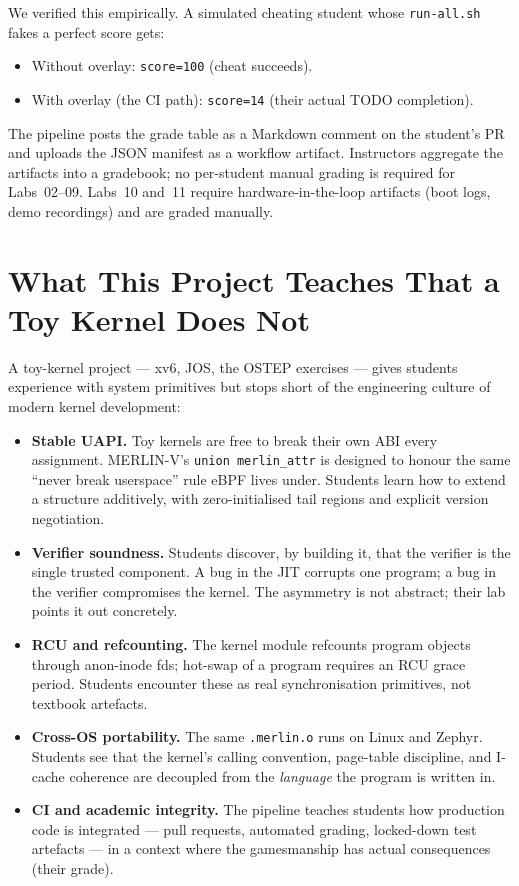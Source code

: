 \documentclass[11pt,a4paper]{article}
\begin{document}
We verified this empirically.  A simulated cheating student
whose \texttt{run-all.sh} fakes a perfect score gets:
\begin{itemize}[leftmargin=*]
  \item Without overlay: \texttt{score=100} (cheat succeeds).
  \item With overlay (the CI path):  \texttt{score=14}
    (their actual TODO completion).
\end{itemize}

The pipeline posts the grade table as a Markdown comment on the
student's PR and uploads the JSON manifest as a workflow
artifact.  Instructors aggregate the artifacts into a
gradebook; no per-student manual grading is required for
Labs~02--09.  Labs~10 and~11 require hardware-in-the-loop
artifacts (boot logs, demo recordings) and are graded
manually.

\section{What This Project Teaches That a Toy Kernel Does Not}
\label{sec:contrast}

A toy-kernel project --- xv6, JOS, the OSTEP exercises --- gives
students experience with system primitives but stops short of
the engineering culture of modern kernel development:
\begin{itemize}[leftmargin=*]
  \item \textbf{Stable UAPI.}  Toy kernels are free to break
    their own ABI every assignment.  MERLIN-V's
    \texttt{union merlin\_attr} is designed to honour the same
    ``never break userspace'' rule eBPF lives under.  Students
    learn how to extend a structure additively, with
    zero-initialised tail regions and explicit version
    negotiation.
  \item \textbf{Verifier soundness.}  Students discover, by
    building it, that the verifier is the single trusted
    component.  A bug in the JIT corrupts one program; a bug
    in the verifier compromises the kernel.  The asymmetry is
    not abstract; their lab points it out concretely.
  \item \textbf{RCU and refcounting.}  The kernel module
    refcounts program objects through anon-inode fds; hot-swap
    of a program requires an RCU grace period.  Students
    encounter these as real synchronisation primitives, not
    textbook artefacts.
  \item \textbf{Cross-OS portability.}  The same
    \texttt{.merlin.o} runs on Linux and Zephyr.  Students see
    that the kernel's calling convention, page-table
    discipline, and I-cache coherence are decoupled from the
    \emph{language} the program is written in.
  \item \textbf{CI and academic integrity.}  The pipeline
    teaches students how production code is integrated --- pull
    requests, automated grading, locked-down test artefacts
    --- in a context where the gamesmanship has actual
    consequences (their grade).
\end{itemize}
\end{document}
